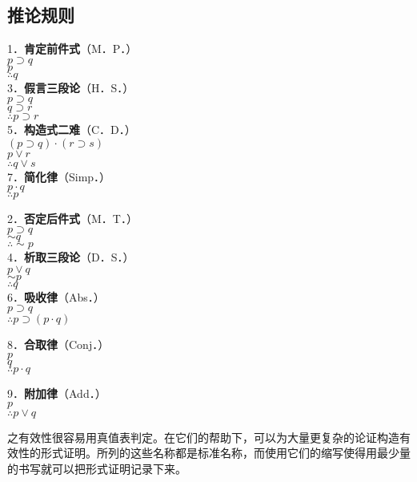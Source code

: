 \subsection{推论规则}
1．\textbf{肯定前件式}（M．P．）\\
$p \supset q$\\
$p$\\
$\therefore q$\\
3．\textbf{假言三段论}（H．S．）\\
$p \supset q$\\
$q \supset r$\\
$\therefore p \supset r$\\
5．\textbf{构造式二难}（C．D．）\\
$(p \supset q) \cdot(r \supset s)$\\
$p \vee r$\\
$\therefore q \vee s$\\
7．\textbf{简化律}（Simp．）\\
$p \cdot q$\\
$\therefore p$

2．\textbf{否定后件式}（M．T．）\\
$p \supset q$\\
$\sim q$\\
$\therefore \sim p$\\
4．\textbf{析取三段论}（D．S．）\\
$p \vee q$\\
$\sim p$\\
$\therefore q$\\
6．\textbf{吸收律}（Abs．）\\
$p \supset q$\\
$\therefore p \supset(p \cdot q)$

8．\textbf{合取律}（Conj．）\\
$p$\\
$q$\\
$\therefore p \cdot q$

9．\textbf{附加律}（Add．）\\
$p$\\
$\therefore p \vee q$

之有效性很容易用真值表判定。在它们的帮助下，可以为大量更复杂的论证构造有效性的形式证明。所列的这些名称都是标准名称，而使用它们的缩写使得用最少量的书写就可以把形式证明记录下来。 

